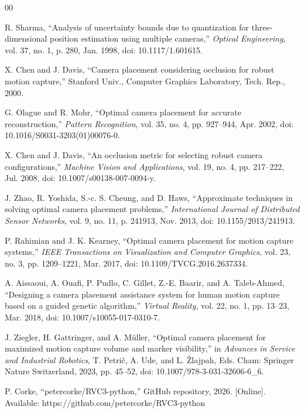 \documentclass[conference]{IEEEtran}
\begin{document}
\begin{thebibliography}{00}

R. Sharma, ``Analysis of uncertainty bounds due to quantization for three-dimensional position estimation using multiple cameras,'' \textit{Optical Engineering}, vol. 37, no. 1, p. 280, Jan. 1998, doi: 10.1117/1.601615.

X. Chen and J. Davis, ``Camera placement considering occlusion for robust motion capture,'' Stanford Univ., Computer Graphics Laboratory, Tech. Rep., 2000.

G. Olague and R. Mohr, ``Optimal camera placement for accurate reconstruction,'' \textit{Pattern Recognition}, vol. 35, no. 4, pp. 927--944, Apr. 2002, doi: 10.1016/S0031-3203(01)00076-0.

X. Chen and J. Davis, ``An occlusion metric for selecting robust camera configurations,'' \textit{Machine Vision and Applications}, vol. 19, no. 4, pp. 217--222, Jul. 2008, doi: 10.1007/s00138-007-0094-y.

J. Zhao, R. Yoshida, S.-c. S. Cheung, and D. Haws, ``Approximate techniques in solving optimal camera placement problems,'' \textit{International Journal of Distributed Sensor Networks}, vol. 9, no. 11, p. 241913, Nov. 2013, doi: 10.1155/2013/241913.

P. Rahimian and J. K. Kearney, ``Optimal camera placement for motion capture systems,'' \textit{IEEE Transactions on Visualization and Computer Graphics}, vol. 23, no. 3, pp. 1209--1221, Mar. 2017, doi: 10.1109/TVCG.2016.2637334.

A. Aissaoui, A. Ouafi, P. Pudlo, C. Gillet, Z.-E. Baarir, and A. Taleb-Ahmed, ``Designing a camera placement assistance system for human motion capture based on a guided genetic algorithm,'' \textit{Virtual Reality}, vol. 22, no. 1, pp. 13--23, Mar. 2018, doi: 10.1007/s10055-017-0310-7.

J. Ziegler, H. Gattringer, and A. M\"{u}ller, ``Optimal camera placement for maximized motion capture volume and marker visibility,'' in \textit{Advances in Service and Industrial Robotics}, T. Petri\v{c}, A. Ude, and L. \v{Z}lajpah, Eds. Cham: Springer Nature Switzerland, 2023, pp. 45--52, doi: 10.1007/978-3-031-32606-6\_6.

P. Corke, ``petercorke/RVC3-python,'' GitHub repository, 2026. [Online]. Available: https://github.com/petercorke/RVC3-python

\end{thebibliography}
\end{document}

